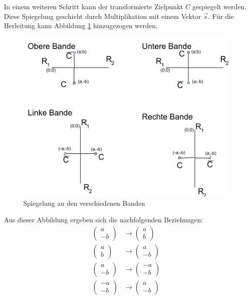In einem weiteren Schritt kann der transformierte Zielpunkt $C$ gespiegelt werden. Diese Spiegelung geschieht durch
Multiplikation mit einem Vektor $\vec{s}$. Für die Herleitung kann Abbildung \ref{fig:bandenspiegelung} hinzugezogen werden.

\begin{figure}[h!]
    \begin{center}
        \includegraphics[width=0.8\linewidth]{../common/07_appendix/resources/02_bandenspiegelung.png}
    \end{center}
    \caption{Spiegelung an den verschiedenen Banden}
    \label{fig:bandenspiegelung}
\end{figure}

Aus dieser Abbildung ergeben sich die nachfolgenden Beziehungen:
\begin{align}
    \begin{pmatrix}a \\ -b\end{pmatrix} &\rightarrow \begin{pmatrix}a \\ b\end{pmatrix}\\
    \begin{pmatrix}a \\ b\end{pmatrix} &\rightarrow \begin{pmatrix}a \\ -b\end{pmatrix}\\
    \begin{pmatrix}a \\ -b\end{pmatrix} &\rightarrow \begin{pmatrix}-a \\ -b\end{pmatrix}\\
    \begin{pmatrix}-a \\ -b\end{pmatrix} &\rightarrow \begin{pmatrix}a \\ -b\end{pmatrix}\\
\end{align}

